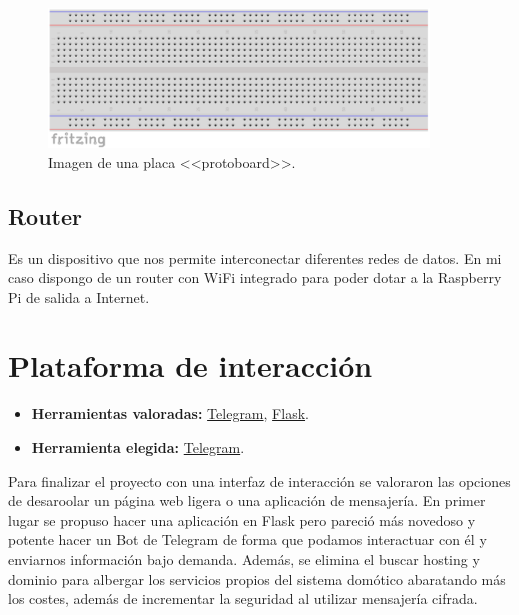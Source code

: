 \begin{figure}
    \centering
    \includegraphics[width=0.9\textwidth]{img/protoboard.pdf}
    \caption{Imagen de una placa <<protoboard>>. } \label{Img:Protoboard}
\end{figure}

\subsection{Router}
Es un dispositivo que nos permite interconectar diferentes redes de datos. En mi caso dispongo de un router con WiFi integrado para poder dotar a la Raspberry Pi de salida a Internet.

\section{Plataforma de interacción}
\begin{itemize}
    \item \textbf{Herramientas valoradas:} \href{https://telegram.org/}{Telegram}, \href{https://palletsprojects.com/p/flask/}{Flask}.
    \item \textbf{Herramienta elegida:} \href{https://telegram.org/}{Telegram}.
\end{itemize}
Para finalizar el proyecto con una interfaz de interacción se valoraron las opciones de desaroolar un página web ligera o una aplicación de mensajería.
En primer lugar se propuso hacer una aplicación en Flask pero pareció más novedoso y potente hacer un Bot de Telegram de forma que podamos interactuar con él y enviarnos información bajo demanda. Además, se elimina el buscar hosting y dominio para albergar los servicios propios del sistema domótico abaratando más los costes, además de incrementar la seguridad al utilizar mensajería cifrada.

